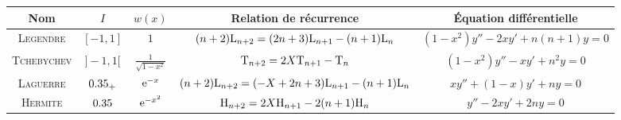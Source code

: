 \begin{figure*}[h!]
    \begingroup
    \renewcommand{\arraystretch}{1.5} %
    \begin{tabular}{|c|c|c|c|c|}
        \hline
        Nom & $I$ & $w(x)$ & Relation de récurrence & Équation différentielle\\
        \hline \hline
        \textsc{Legendre} & $[-1, 1]$ & $1$ & $(n+2) \mathrm{L}_{n+2} = (2n+3) \mathrm{L}_{n+1} - (n+1)\mathrm{L}_n$ & $(1-x^2) y'' - 2xy' + n(n+1) y = 0$\\
        \hline
        \textsc{Tchebychev} & $]-1, 1[$ & $\frac{1}{\sqrt{1-x^2}}$ & $\mathrm{T}_{n+2} = 2X \mathrm{T}_{n+1} - \mathrm{T}_n$ & $(1-x^2)y'' - xy' + n^2y = 0$ \\
        \hline
        \textsc{Laguerre} & $0.35_+$ & $\mathrm{e}^{-x}$ & $(n+2) \mathrm{L}_{n+2} = (-X+2n+3) \mathrm{L}_{n+1} - (n+1) \mathrm{L}_n$ & $xy'' + (1-x)y' + ny = 0$\\
        \hline
        \textsc{Hermite} & $0.35$ & $\mathrm{e}^{-x^2}$ & $\mathrm{H}_{n+2} = 2X \mathrm{H}_{n+1} - 2(n+1) \mathrm{H}_n$ & $y'' - 2xy' + 2ny = 0$\\
        \hline
    \end{tabular}
    \endgroup
\end{figure*}
